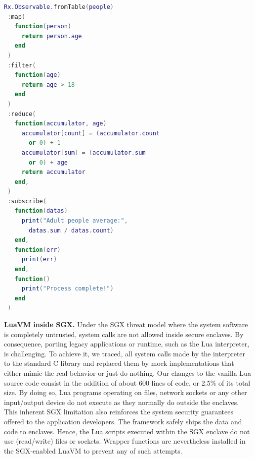 \begin{lstlisting}[language=LUA,caption={Example of process pipeline with RxLua.},label=pipeline-example]
Rx.Observable.fromTable(people)
 :map(
   function(person)
     return person.age
   end
 )
 :filter(
   function(age)
     return age > 18
   end
 )
 :reduce(
   function(accumulator, age)
     accumulator[count] = (accumulator.count
       or 0) + 1
     accumulator[sum] = (accumulator.sum
       or 0) + age
     return accumulator
   end,
 )
 :subscribe(
   function(datas)
     print("Adult people average:",
       datas.sum / datas.count)
   end,
   function(err)
     print(err)
   end,
   function()
     print("Process complete!")
   end
 )
\end{lstlisting}
\textbf{LuaVM inside SGX.} Under the SGX threat model where the system software is completely untrusted, system calls are not allowed inside secure enclaves.
By consequence, porting legacy applications or runtime, such as the Lua interpreter, is challenging.
To achieve it, we traced, all system calls made by the interpreter to the standard C library and replaced them by mock implementations that either mimic the real behavior or just do nothing.
Our changes to the vanilla Lua source code consist in the addition of about 600 lines of code, or 2.5\% of its total size.
By doing so, Lua programs operating on files, network sockets or any other input/output device do not execute as they normally do outside the enclaves. %
This inherent SGX limitation also reinforces the system security guarantees offered to the application developers.
The \SYS framework safely ships the data and code to enclaves.
Hence, the Lua scripts executed within the SGX enclave do not use (read/write) files or sockets.
Wrapper functions are nevertheless installed in the SGX-enabled LuaVM to prevent any of such attempts.

